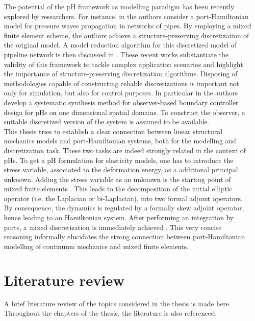 The potential of the pH framework as modelling paradigm has been recently explored by researchers. For instance, in \cite{egger2018damped} the authors consider a port-Hamiltonian model for pressure waves propagation in networks of pipes. By employing a mixed finite element scheme, the authors achieve a structure-preserving discretization of the original model. A model reduction algorithm for this discretized model of pipeline network is then discussed in \cite{egger2018}. These recent works substantiate the validity of this framework to tackle complex application scenarios and highlight the importance of structure-preserving discretization algorithms. Disposing of methodologies capable of constructing reliable discretizations is important not only for simulation, but also for control purposes. In particular in \cite{toledo2020} the authors develop a systematic synthesis method for observer-based boundary controller design for pHs on one dimensional spatial domains. To construct the observer, a suitable discretized version of the system is assumed to be available. \\

This thesis tries to establish a clear connection between linear structural mechanics models and port-Hamiltonian systems, both for the modelling and discretization task. These two tasks are indeed strongly related in the context of pHs. To get a pH formulation for elasticity models, one has to introduce the stress variable, associated to the deformation energy, as a additional principal unknown. Adding the stress variable as an unknown is the starting point of mixed finite elements \cite{arnold1990intro}. This leads to the decomposition of the initial elliptic operator (i.e. the Laplacian or bi-Laplacian), into two formal adjoint operators. By consequence, the dynamics is regulated by a formally skew adjoint operator, hence leading to an Hamiltonian system. After performing an integration by parts, a mixed discretization is immediately achieved \cite{joly2003variational}. This very concise reasoning informally elucidates the strong connection between port-Hamiltonian modelling of continuum mechanics and mixed finite elements. 


\section{Literature review}
A brief literature review of the topics considered in the thesis is made here. Throughout the chapters of the thesis, the literature is also referenced.


